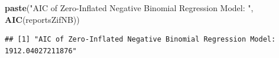 \documentclass[
]{article}
\newenvironment{Shaded}{\begin{snugshade}}{\end{snugshade}}
\newcommand{\KeywordTok}[1]{\textcolor[rgb]{0.13,0.29,0.53}{\textbf{#1}}}
\newcommand{\NormalTok}[1]{#1}
\newcommand{\StringTok}[1]{\textcolor[rgb]{0.31,0.60,0.02}{#1}}
\begin{document}
\begin{Shaded}
\begin{Highlighting}[]
\KeywordTok{paste}\NormalTok{(}\StringTok{"AIC of Zero-Inflated Negative Binomial Regression Model: "}\NormalTok{, }\KeywordTok{AIC}\NormalTok{(reportsZifNB))}
\end{Highlighting}
\end{Shaded}

\begin{verbatim}
## [1] "AIC of Zero-Inflated Negative Binomial Regression Model:  1912.04027211876"
\end{verbatim}
\end{document}
